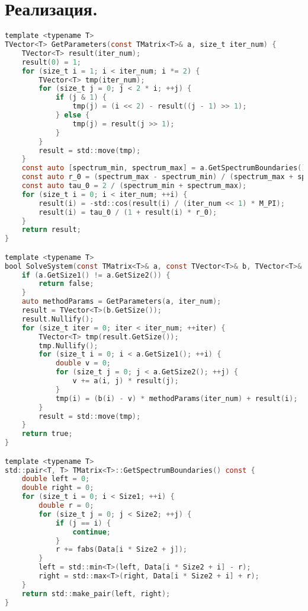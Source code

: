\documentclass[a4paper,12pt]{article}
\begin{document}
\section*{Реализация.}
\begin{lstlisting}[style=chstyle, language=C, numbers=none]
template <typename T>
TVector<T> GetParameters(const TMatrix<T>& a, size_t iter_num) {
    TVector<T> result(iter_num);
    result(0) = 1;
    for (size_t i = 1; i < iter_num; i *= 2) {
        TVector<T> tmp(iter_num);
        for (size_t j = 0; j < 2 * i; ++j) {
            if (j & 1) {
                tmp(j) = (i << 2) - result((j - 1) >> 1);
            } else {
                tmp(j) = result(j >> 1);
            }
        }
        result = std::move(tmp);
    }
    const auto [spectrum_min, spectrum_max] = a.GetSpectrumBoundaries();
    const auto r_0 = (spectrum_max - spectrum_min) / (spectrum_max + spectrum_min);
    const auto tau_0 = 2 / (spectrum_min + spectrum_max);
    for (size_t i = 0; i < iter_num; ++i) {
        result(i) = -std::cos(result(i) / (iter_num << 1) * M_PI);
        result(i) = tau_0 / (1 + result(i) * r_0);
    }
    return result;
}

template <typename T>
bool SolveSystem(const TMatrix<T>& a, const TVector<T>& b, TVector<T>& result, const size_t iter_num) {
    if (a.GetSize1() != a.GetSize2()) {
        return false;
    }
    auto methodParams = GetParameters(a, iter_num);
    result = TVector<T>(b.GetSize());
    result.Nullify();
    for (size_t iter = 0; iter < iter_num; ++iter) {
        TVector<T> tmp(result.GetSize());
        tmp.Nullify();
        for (size_t i = 0; i < a.GetSize1(); ++i) {
            double v = 0;
            for (size_t j = 0; j < a.GetSize2(); ++j) {
                v += a(i, j) * result(j);
            }
            tmp(i) = (b(i) - v) * methodParams(iter_num) + result(i);
        }
        result = std::move(tmp);
    }
    return true;
}

template <typename T>
std::pair<T, T> TMatrix<T>::GetSpectrumBoundaries() const {
    double left = 0;
    double right = 0;
    for (size_t i = 0; i < Size1; ++i) {
        double r = 0;
        for (size_t j = 0; j < Size2; ++j) {
            if (j == i) {
                continue;
            }
            r += fabs(Data[i * Size2 + j]);
        }
        left = std::min<T>(left, Data[i * Size2 + i] - r);
        right = std::max<T>(right, Data[i * Size2 + i] + r);
    }
    return std::make_pair(left, right);
}
\end{lstlisting}
\end{document}
